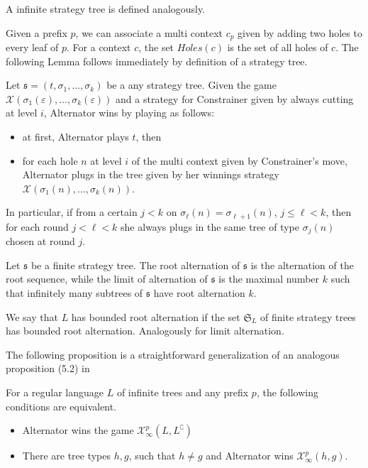 \documentclass{llncs}
\begin{document}
A  infinite strategy tree is defined analogously.

Given a prefix $p$, we can associate a multi context $c_p$ given by adding two holes to every leaf of $p$. For a context $c$, the set $Holes(c)$ is the set of all holes of $c$. The following Lemma follows immediately by definition of a strategy tree.

\begin{lemma}\label{lemma:short_strategy}
Let $\mathfrak{s}=(t, \sigma_1, \dots, \sigma_k)$ be a any strategy tree. Given the  game $\mathcal{X}(\sigma_1(\varepsilon), \dots, \sigma_k(\varepsilon))$ and a strategy for Constrainer given by always cutting at level $i$, Alternator wins  by playing as follows:
\begin{itemize}
\item at first, Alternator plays $t$, then
\item for each hole $n$ at level $i$ of the multi context given by Constrainer's move, Alternator plugs in the tree given by her winnings strategy $\mathcal{X}(\sigma_1(n), \dots, \sigma_k(n))$.
\end{itemize}
In particular, if from a certain $j<k$ on $\sigma_\ell(n)=\sigma_{\ell+1}(n)$, $j\leq \ell < k$, then for each round $j< \ell < k$ she always plugs in the same tree of type $\sigma_j(n)$ chosen at round $j$.

\end{lemma}

Let $\mathfrak{s}$ be a finite strategy tree. The root alternation of $\mathfrak{s}$ is the alternation of the root sequence, while the limit of alternation of $\mathfrak{s}$ is the maximal number $k$ such that infinitely many subtrees of $\mathfrak{s}$ have root alternation $k$.

We say that $L$ has bounded root alternation if the set $\mathfrak{S}_L$ of finite strategy trees has bounded root alternation. Analogously for limit alternation.

The following proposition is a straightforward generalization of an analogous proposition (5.2) in \cite{bp}

\begin{proposition}\label{prop:tree_to_types}
 For a regular language $L$ of infinite trees and any prefix $p$, the following conditions are equivalent.
 \begin{itemize}
\item Alternator wins the game $\mathcal{X}^p_\infty(L, L^\complement)$ 
 \item  There are tree types $h, g$, such that $h\neq g$ and Alternator wins $\mathcal{X}^p_\infty(h, g)$.
 \end{itemize}
\end{proposition}
\end{document}
